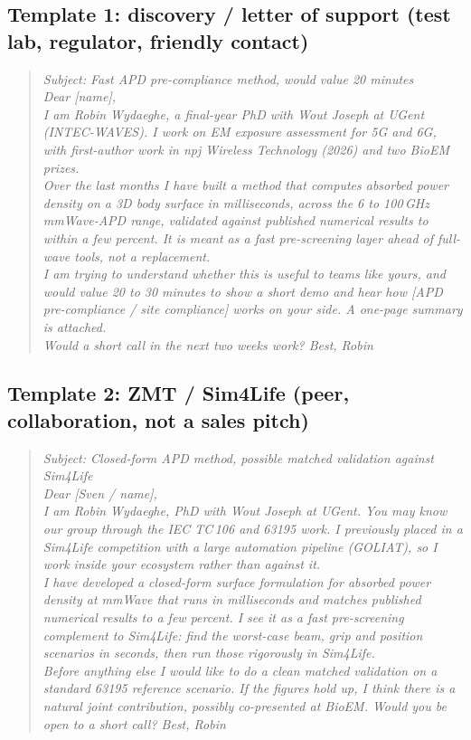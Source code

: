 \documentclass[11pt,a4paper]{article}
\begin{document}
\subsection*{Template 1: discovery / letter of support (test lab, regulator, friendly contact)}
\begin{quote}\itshape
Subject: Fast APD pre-compliance method, would value 20 minutes\\[0.3em]
Dear [name],\\[0.3em]
I am Robin Wydaeghe, a final-year PhD with Wout Joseph at UGent (INTEC-WAVES). I work on EM exposure assessment for 5G and 6G, with first-author work in npj Wireless Technology (2026) and two BioEM prizes.\\[0.3em]
Over the last months I have built a method that computes absorbed power density on a 3D body surface in milliseconds, across the 6 to 100\,GHz mmWave-APD range, validated against published numerical results to within a few percent. It is meant as a fast pre-screening layer ahead of full-wave tools, not a replacement.\\[0.3em]
I am trying to understand whether this is useful to teams like yours, and would value 20 to 30 minutes to show a short demo and hear how [APD pre-compliance / site compliance] works on your side. A one-page summary is attached.\\[0.3em]
Would a short call in the next two weeks work? Best, Robin
\end{quote}

\subsection*{Template 2: ZMT / Sim4Life (peer, collaboration, not a sales pitch)}
\begin{quote}\itshape
Subject: Closed-form APD method, possible matched validation against Sim4Life\\[0.3em]
Dear [Sven / name],\\[0.3em]
I am Robin Wydaeghe, PhD with Wout Joseph at UGent. You may know our group through the IEC TC\,106 and 63195 work. I previously placed in a Sim4Life competition with a large automation pipeline (GOLIAT), so I work inside your ecosystem rather than against it.\\[0.3em]
I have developed a closed-form surface formulation for absorbed power density at mmWave that runs in milliseconds and matches published numerical results to a few percent. I see it as a fast pre-screening complement to Sim4Life: find the worst-case beam, grip and position scenarios in seconds, then run those rigorously in Sim4Life.\\[0.3em]
Before anything else I would like to do a clean matched validation on a standard 63195 reference scenario. If the figures hold up, I think there is a natural joint contribution, possibly co-presented at BioEM. Would you be open to a short call? Best, Robin
\end{quote}
\end{document}
